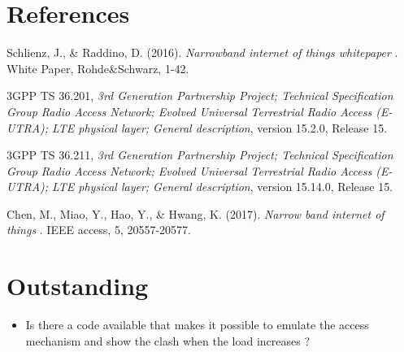 \documentclass[10pt,a4paper,titlepage,twoside]{article}
\newcommand{\point}[1]{\textbf{\color{ymared} #1}}
\begin{document}
\section{References}

\begin{thebibliography}{4}
Schlienz, J., \& Raddino, D. (2016).
\textit{Narrowband internet of things whitepaper}
. White Paper, Rohde\&Schwarz, 1-42.

3GPP TS 36.201,
\textit{3rd Generation Partnership Project; Technical Specification Group Radio Access Network; Evolved Universal Terrestrial Radio Access (E-UTRA); LTE physical layer; General description}, version 15.2.0, Release 15.

3GPP TS 36.211,
\textit{3rd Generation Partnership Project; Technical Specification Group Radio Access Network; Evolved Universal Terrestrial Radio Access (E-UTRA); LTE physical layer; General description}, version 15.14.0, Release 15.

Chen, M., Miao, Y., Hao, Y., \& Hwang, K. (2017).
\textit{Narrow band internet of things}
. IEEE access, 5, 20557-20577.

\end{thebibliography}


\clearpage
\section{\point{Outstanding}}

\begin{itemize}
\item Is there a code available that makes it possible to emulate the access mechanism and show the clash when the load increases ?

\end{itemize}
\end{document}
